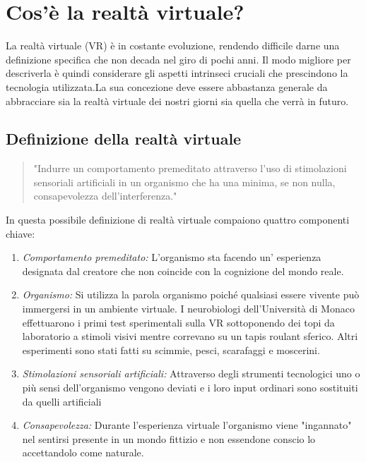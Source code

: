 \section{Cos'è la realtà virtuale?}

La realtà virtuale (VR) è in costante evoluzione, rendendo difficile darne una definizione specifica che non decada nel giro di pochi anni. Il modo migliore per descriverla è quindi considerare gli aspetti intrinseci cruciali che prescindono la tecnologia utilizzata.La sua concezione deve essere abbastanza generale da abbracciare sia la realtà virtuale dei nostri giorni sia quella che verrà in futuro.
\subsection{Definizione della realtà virtuale}

\begin{quotation}"Indurre un comportamento premeditato attraverso l'uso di stimolazioni sensoriali artificiali in un organismo che ha una minima, se non nulla, consapevolezza dell'interferenza."\cite{VRbook}
\end{quotation}	
In questa possibile definizione di realtà virtuale compaiono quattro componenti chiave:

\begin{enumerate}
	\item \textit{Comportamento premeditato:} L'organismo sta facendo un' esperienza designata dal creatore
	che non coincide con la cognizione del mondo reale.
	\item \textit{Organismo:} Si utilizza la parola organismo poiché qualsiasi essere vivente può immergersi in un ambiente virtuale. I neurobiologi dell'Università di Monaco effettuarono i primi test sperimentali sulla VR sottoponendo dei topi da laboratorio a stimoli visivi mentre correvano su un tapis roulant sferico. Altri esperimenti sono stati fatti su scimmie, pesci, scarafaggi e moscerini.
	\item \textit{Stimolazioni sensoriali artificiali:} Attraverso degli strumenti tecnologici uno o più sensi dell'organismo vengono deviati e i loro input ordinari sono sostituiti da quelli artificiali
	\item \textit{Consapevolezza:} Durante l'esperienza virtuale l'organismo viene "ingannato" nel sentirsi presente in un mondo fittizio e non essendone conscio lo accettandolo come naturale.
\end{enumerate}

